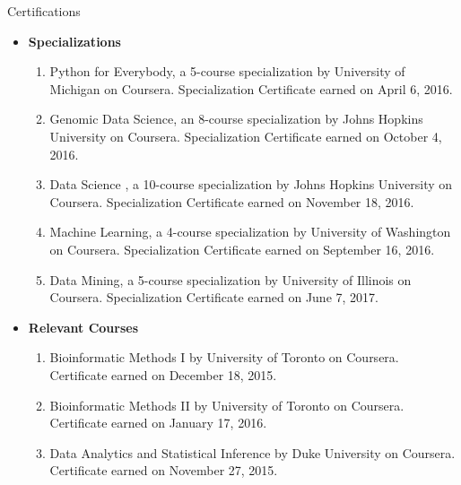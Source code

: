 \documentclass{resume} %
\begin{document}
\begin{rSection}{Certifications}
\begin{itemize}
\item \noindent \textbf{Specializations}
\begin{enumerate}
\item \noindent Python for Everybody, a 5-course specialization by University of Michigan on Coursera. Specialization Certificate earned on April 6, 2016.
\item \noindent Genomic Data Science, an 8-course specialization by Johns Hopkins University on Coursera. Specialization Certificate earned on October 4, 2016.
\item \noindent Data Science , a 10-course specialization by Johns Hopkins University on Coursera. Specialization Certificate earned on November 18, 2016.
\item \noindent Machine Learning, a 4-course specialization by University of Washington on Coursera. Specialization Certificate earned on September 16, 2016.
\item \noindent Data Mining, a 5-course specialization by University of Illinois on Coursera. Specialization Certificate earned on June 7, 2017.
\end{enumerate}
\item \noindent \textbf{Relevant Courses}
\begin{enumerate}
\item  Bioinformatic Methods I by University of Toronto on Coursera. Certificate earned on December 18, 2015.
\item  Bioinformatic Methods II by University of Toronto on Coursera. Certificate earned on January 17, 2016.
\item Data Analytics and Statistical Inference by Duke University on Coursera. Certificate earned on November 27, 2015.

\end{enumerate}
\end{itemize}
\end{rSection}
\end{document}
